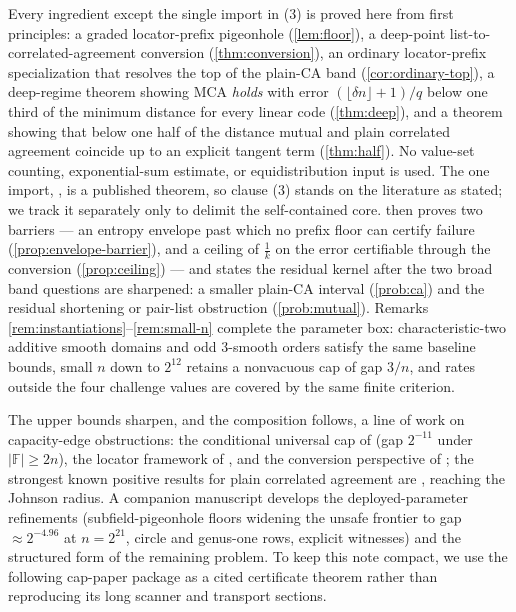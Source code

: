 \documentclass[11pt]{amsart}
\theoremstyle{definition}
\theoremstyle{remark}
\newcommand{\F}{\mathbb{F}}
\begin{document}
Every ingredient except the single import in (3) is proved here from first principles: a graded locator-prefix pigeonhole (\cref{lem:floor}), a deep-point list-to-correlated-agreement conversion (\cref{thm:conversion}), an ordinary locator-prefix specialization that resolves the top of the plain-CA band (\cref{cor:ordinary-top}), a deep-regime theorem showing MCA \emph{holds} with error $(\lfloor\delta n\rfloor+1)/q$ below one third of the minimum distance for every linear code (\cref{thm:deep}), and a theorem showing that below one half of the distance mutual and plain correlated agreement coincide up to an explicit tangent term (\cref{thm:half}). No value-set counting, exponential-sum estimate, or equidistribution input is used. The one import, \cite[Thm.~4.1]{BCIKS20}, is a published theorem, so clause (3) stands on the literature as stated; we track it separately only to delimit the self-contained core.  then proves two barriers --- an entropy envelope past which no prefix floor can certify failure (\cref{prop:envelope-barrier}), and a ceiling of $\frac1k$ on the error certifiable through the conversion (\cref{prop:ceiling}) --- and states the residual kernel after the two broad band questions are sharpened: a smaller plain-CA interval (\cref{prob:ca}) and the residual shortening or pair-list obstruction (\cref{prob:mutual}). Remarks \ref{rem:instantiations}--\ref{rem:small-n} complete the parameter box: characteristic-two additive smooth domains and odd $3$-smooth orders satisfy the same baseline bounds, small $n$ down to $2^{12}$ retains a nonvacuous cap of gap $3/n$, and rates outside the four challenge values are covered by the same finite criterion.

The upper bounds sharpen, and the composition follows, a line of work on capacity-edge obstructions: the conditional universal cap of \cite{Cho26b} (gap $2^{-11}$ under $|\F|\ge2n$), the locator framework of \cite{Cho26a}, and the conversion perspective of \cite{CS25}; the strongest known positive results for plain correlated agreement are \cite{BCIKS20,BCHKS25}, reaching the Johnson radius. A companion manuscript \cite{Cho26b} develops the deployed-parameter refinements (subfield-pigeonhole floors widening the unsafe frontier to gap $\approx2^{-4.96}$ at $n=2^{21}$, circle and genus-one rows, explicit witnesses) and the structured form of the remaining problem.  To keep this note compact, we use the following cap-paper package as a cited certificate theorem rather than reproducing its long scanner and transport sections.
\end{document}
